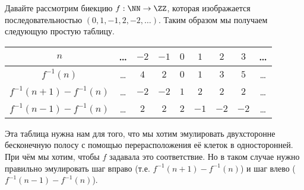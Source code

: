\documentclass[12pt,a4paper]{article}
\begin{document}
    \begin{enumproblem}
        Давайте рассмотрим биекцию $f: \NN \to \ZZ$, которая изображается последовательностью $(0, 1, -1, 2, -2, \dots)$. Таким образом мы получаем следующую простую таблицу.
        \begin{table}[H]
            \centering
            \begin{tabular}{c||c|c|c|c|c|c|c|c}
                $n$& \dots& $-2$& $-1$& $0$& $1$& $2$& $3$& \dots\\
                \hline
                \hline
                $f^{-1}(n)$& \dots& $4$& $2$& $0$& $1$& $3$& $5$& \dots\\
                \hline
                $f^{-1}(n+1) - f^{-1}(n)$& \dots& $-2$& $-2$& $1$& $2$& $2$& $2$& \dots\\
                \hline
                $f^{-1}(n-1) - f^{-1}(n)$& \dots& $2$& $2$& $2$& $-1$& $-2$& $-2$& \dots
            \end{tabular}
        \end{table}
        Эта таблица нужна нам для того, что мы хотим эмулировать двухсторонне бесконечную полосу с помощью перерасположения её клеток в односторонней. При чём мы хотим, чтобы $f$ задавала это соответствие. Но в таком случае нужно правильно эмулировать шаг вправо (т.е. $f^{-1}(n+1) - f^{-1}(n)$) и шаг влево ($f^{-1}(n-1) - f^{-1}(n)$).


\end{enumproblem}
\end{document}
